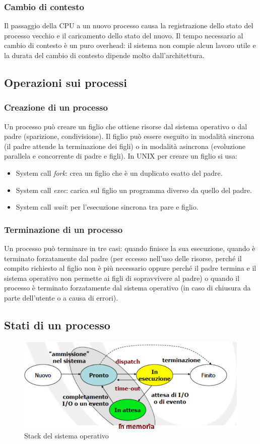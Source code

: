 \subsubsection{Cambio di contesto}
Il passaggio della CPU a un nuovo processo causa la registrazione dello stato del processo vecchio e il caricamento dello stato del nuovo. Il tempo necessario al cambio di contesto 
\`e un puro overhead: il sistema non compie alcun lavoro utile e la durata del cambio di contesto dipende molto dall'architettura.
\subsection{Operazioni sui processi}
\subsubsection{Creazione di un processo}
Un processo pu\`o creare un figlio che ottiene risorse dal sistema operativo o dal padre (sparizione, condivisione). Il figlio pu\`o essere eseguito in modalit\`a sincrona (il padre
attende la terminazione dei figli) o in modalit\`a asincrona (evoluzione parallela e concorrente di padre e figli). In UNIX per creare un figlio si usa:
\begin{itemize}
	\item System call \emph{fork}: crea un figlio che \`e un duplicato esatto del padre.
	\item System call \emph{exec}: carica sul figlio un programma diverso da quello del padre.
	\item System call \emph{wait}: per l'esecuzione sincrona tra pare e figlio.
\end{itemize}
\subsubsection{Terminazione di un processo}
Un processo pu\`o terminare in tre casi: quando finisce la sua esecuzione, quando \`e terminato forzatamente dal padre (per eccesso nell'uso delle risorse, perché il compito richiesto al figlio
non \`e pi\`u necessario oppure perché il padre termina e il sistema operativo non permette ai figli di sopravvivere al padre) o quando il processo \`e terminato forzatamente dal sistema operativo
(in caso di chiusura da parte dell'utente o a causa di errori). 
\subsection{Stati di un processo}
\begin{figure}[h]
	\includegraphics[width=\textwidth]{Pictures/StatiProcesso.png}
	\caption{Stack del sistema operativo}
\end{figure}
